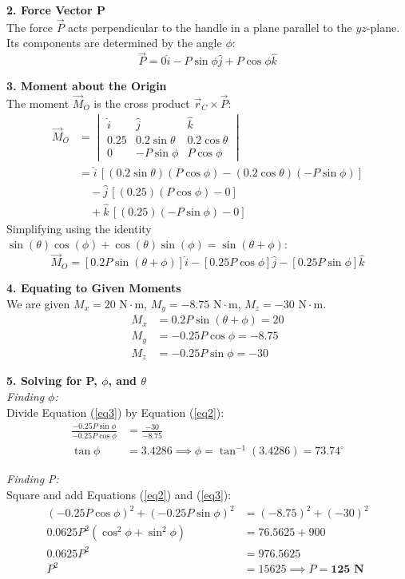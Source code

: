 \documentclass[12pt,a3paper]{article}
\begin{document}
\begin{enumerate}
\begin{tcolorbox}[enhanced,breakable,ansbox,colback=cD!4,colframe=cD,
  boxrule=0.8pt,arc=5pt,
  title={\textbf{Solution}},fonttitle=\bfseries\color{white},
  colbacktitle=cD]
\textbf{2. Force Vector P} \\
The force $\vec{P}$ acts perpendicular to the handle in a plane parallel to the $yz$-plane. Its components are determined by the angle $\phi$:
\[ \vec{P} = 0\hat{i} - P\sin\phi\hat{j} + P\cos\phi\hat{k} \]

\textbf{3. Moment about the Origin} \\
The moment $\vec{M}_O$ is the cross product $\vec{r}_C \times \vec{P}$:
\begin{align*}
\vec{M}_O &= \begin{vmatrix}
\hat{i} & \hat{j} & \hat{k} \\
0.25 & 0.2\sin\theta & 0.2\cos\theta \\
0 & -P\sin\phi & P\cos\phi
\end{vmatrix} \\
&= \hat{i} \, [ (0.2\sin\theta)(P\cos\phi) - (0.2\cos\theta)(-P\sin\phi) ] \\
&\quad - \hat{j} \, [ (0.25)(P\cos\phi) - 0 ] \\
&\quad + \hat{k} \, [ (0.25)(-P\sin\phi) - 0 ] 
\end{align*}
Simplifying using the identity $\sin(\theta)\cos(\phi) + \cos(\theta)\sin(\phi) = \sin(\theta + \phi)$:
\[ \vec{M}_O = [0.2P\sin(\theta + \phi)]\hat{i} - [0.25P\cos\phi]\hat{j} - [0.25P\sin\phi]\hat{k} \]

\textbf{4. Equating to Given Moments} \\
We are given $M_x = 20 \text{ N}\cdot\text{m}$, $M_y = -8.75 \text{ N}\cdot\text{m}$, $M_z = -30 \text{ N}\cdot\text{m}$.
\begin{align}
    M_x &= 0.2P\sin(\theta + \phi) = 20 \label{eq1} \\
    M_y &= -0.25P\cos\phi = -8.75 \label{eq2} \\
    M_z &= -0.25P\sin\phi = -30 \label{eq3}
\end{align}

\textbf{5. Solving for P, $\phi$, and $\theta$} \\
\textit{Finding $\phi$:} \\
Divide Equation (\ref{eq3}) by Equation (\ref{eq2}):
\begin{align*}
    \frac{-0.25P\sin\phi}{-0.25P\cos\phi} &= \frac{-30}{-8.75} \\
    \tan\phi &= 3.4286 \implies \phi = \tan^{-1}(3.4286) = \mathbf{73.74^\circ}
\end{align*}

\textit{Finding P:} \\
Square and add Equations (\ref{eq2}) and (\ref{eq3}):
\begin{align*}
    (-0.25P\cos\phi)^2 + (-0.25P\sin\phi)^2 &= (-8.75)^2 + (-30)^2 \\
    0.0625P^2(\cos^2\phi + \sin^2\phi) &= 76.5625 + 900 \\
    0.0625P^2 &= 976.5625 \\
    P^2 &= 15625 \implies P = \mathbf{125 \text{ N}}
\end{align*}


\end{tcolorbox}
\end{enumerate}
\end{document}
